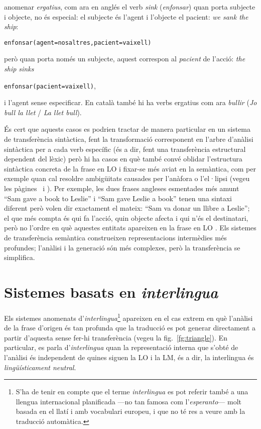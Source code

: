 \begin{itemize}
  anomenar \emph{ergatius}, com ara en anglés el verb \emph{sink}
  (\emph{enfonsar}) quan porta subjecte i objecte, no és especial: el
  subjecte és l'agent i l'objecte el pacient: \emph{we sank the ship}:
  \begin{center}
    \texttt{enfonsar(agent=nosaltres,pacient=vaixell)}
  \end{center}
  però quan porta només un subjecte, aquest correspon al
  \emph{pacient} de l'acció: \emph{the ship sinks}
  \begin{center}
    \texttt{enfonsar(pacient=vaixell)},
  \end{center}
  i l'agent sense especificar. En català també hi ha verbs ergatius
  com ara \emph{bullir} (\emph{Jo bull la llet} / \emph{La llet
    bull}).
\end{itemize}

És cert que aquests casos es podrien tractar de manera particular en
un sistema de transferència sintàctica, fent la transformació
corresponent en l'arbre d'anàlisi sintàctica per a cada verb específic
(és a dir, fent una transferència estructural dependent del lèxic)
però hi ha casos en què també convé oblidar l'estructura sintàctica
concreta de la frase en LO i fixar-se més aviat en la semàntica, com
per exemple quan cal resoldre ambigüitats causades per l'anàfora o
l'el·lipsi (vegeu les pàgines~\pageref{pg:anafora} i
\pageref{pg:ellipsi}).  Per exemple, les dues frases angleses
esmentades més amunt ``Sam gave a book to Leslie'' i ``Sam gave Leslie
a book'' tenen una sintaxi diferent però volen dir exactament el
mateix: ``Sam va donar un llibre a Leslie''; el que més compta és qui
fa l'acció, quin objecte afecta i qui n'és el destinatari, però no
l'ordre en què aquestes entitats apareixen en la frase en LO
\citep{arnold93j}. Els sistemes de transferència semàntica
construeixen representacions intermèdies més profundes; l'anàlisi i la
generació són més complexes, però la transferència se simplifica.

\section{Sistemes basats en \emph{interlingua}}
\label{ss:interlingua}

Els sistemes anomenats d'\emph{interlingua}\footnote{S'ha de tenir en
  compte que el terme \emph{interlingua} es pot referir també a una
  llengua internacional planificada ---no tan famosa com
  l'\emph{esperanto}--- molt basada en el llatí i amb vocabulari
  europeu, i que no té res a veure amb la traducció automàtica.}
apareixen en el cas extrem en què l'anàlisi de la frase d'origen és
tan profunda que la traducció es pot generar directament a partir
d'aquesta sense fer-hi transferència (vegeu la
fig.~\ref{fg:triangle}). En particular, es parla d'\emph{interlingua}
quan la representació interna que s'obté de l'anàlisi és independent
de quines siguen la LO i la LM, és a dir, la interlingua és {\em
  lingüísticament neutral}.

